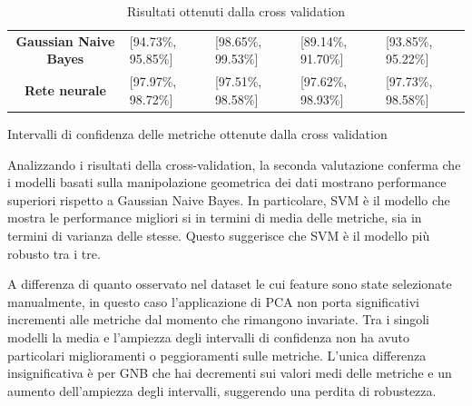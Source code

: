 \begin{table}[!ht]
\begin{subtable}[h]{1\textwidth}
\begin{tabular}{@{}cllll@{}}
            \cellcolor[HTML]{EFEFEF}\textbf{Gaussian Naive Bayes} & [94.73\%, 95.85\%]   & [98.65\%, 99.53\%]  & [89.14\%, 91.70\%] & [93.85\%, 95.22\%] \\
            \cellcolor[HTML]{EFEFEF}\textbf{Rete neurale}         & [97.97\%, 98.72\%]   & [97.51\%, 98.58\%]  & [97.62\%, 98.93\%] & [97.73\%, 98.58\%] \\ \bottomrule
        \end{tabular}
        \caption{Intervalli di confidenza delle metriche ottenute dalla cross validation}
        \label{tab:intervalli_confidenza_pca}
    \end{subtable}
    \caption{Risultati ottenuti dalla cross validation}
    \label{tab:media_intervalli_confidenza_pca}
\end{table}

Analizzando i risultati della cross-validation, la seconda valutazione conferma che i modelli
basati sulla manipolazione geometrica dei dati mostrano performance
superiori rispetto a Gaussian Naive Bayes. In particolare, SVM è il modello che
mostra le performance migliori si in termini di media delle metriche, sia in
termini di varianza delle stesse. Questo suggerisce che SVM è il modello più
robusto tra i tre.

A differenza di quanto osservato nel dataset le cui feature sono state selezionate
manualmente, in questo caso l'applicazione di PCA non porta significativi incrementi
alle metriche dal momento che rimangono invariate. Tra i singoli modelli la media 
e l'ampiezza degli intervalli di confidenza non ha avuto particolari miglioramenti 
o peggioramenti sulle metriche. L'unica differenza insignificativa è per GNB che 
hai decrementi sui valori medi delle metriche e un aumento dell'ampiezza degli
intervalli, suggerendo una perdita di robustezza.

